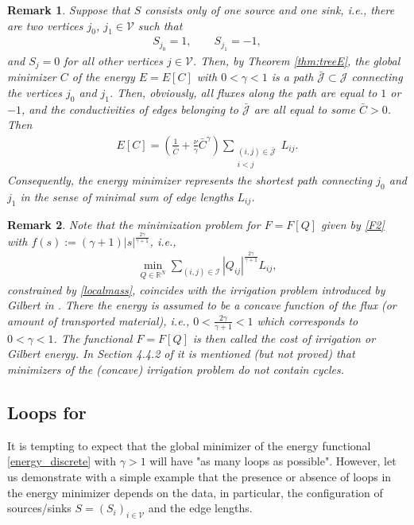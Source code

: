 \documentclass{article}
\numberwithin{equation}{section}
\newtheorem{remark}{Remark}%
\newcommand{\R}{\mathbb{R}}
\def\[{\begin{eqnarray*}}
\def\]{\end{eqnarray*}}
\begin{document}
\begin{remark}
Suppose that $S$ consists only of one source and one sink, i.e., there are
two vertices $j_0$, $j_1\in \mathcal{V}$ such that
\[
   S_{j_0} = 1, \qquad S_{j_1} = -1,
\]
and $S_j=0$ for all other vertices $j\in \mathcal{V}$.
Then, by Theorem \ref{thm:treeE}, the global minimizer $C$
of the energy $E=E[C]$ with $0<\gamma<1$ is a path $\bar{\mathcal{J}} \subset \mathcal{J} $
connecting the vertices $j_0$ and $j_1$.
Then, obviously, all fluxes along the path are equal to $1$ or $-1$,
and the conductivities of edges belonging to $\bar{\mathcal{J}}$ are all equal to some $\bar C>0$.
Then
\[
   E[C] = \left( \frac{1}{\bar C} + \frac{\nu}{\gamma} \bar C^\gamma \right)  \sum_{\substack{(i,j)\in\bar {\mathcal{J}}\\ i<j}} L_{ij}.
\]
Consequently, the energy minimizer represents the shortest path connecting $j_0$ and $j_1$
in the sense of minimal sum of edge lengths $L_{ij}$.
\end{remark}
\vspace{2mm}

\begin{remark}
Note that the minimization problem for $F=F[Q]$ given by \eqref{F2} with $f(s) := (\gamma+1) |s|^\frac{2\gamma}{\gamma+1}$, i.e.,
\[
   \min_{Q\in\R^N} \sum_{(i,j)\in\mathcal{I}} |Q_{ij}|^\frac{2\gamma}{\gamma+1} L_{ij},
\]
constrained by \eqref{localmass}, coincides with the \emph{irrigation problem} introduced by Gilbert in \cite{Gilbert}.
There the energy is assumed to be a concave function of the flux (or amount of transported material), i.e.,
$0 < \frac{2\gamma}{\gamma+1} < 1$ which corresponds to $0 < \gamma<1$.
The functional $F=F[Q]$ is then called the \emph{cost of irrigation} or \emph{Gilbert energy}.
In Section 4.4.2 of \cite{santambrogio2015optimal} it is mentioned (but not proved) that minimizers of the (concave) irrigation problem do not contain cycles.
\end{remark}


\subsection{Loops for }\label{subsec:notrees}
It is tempting to expect that the global minimizer of the energy functional \eqref{energy_discrete} with $\gamma>1$
will have "as many loops as possible". However, let us demonstrate with a simple example that the presence or absence of loops
in the energy minimizer depends on the data, in particular, the configuration of sources/sinks $S=(S_i)_{i\in\mathcal{V}}$ and the edge lengths.
\vspace{2mm}
\end{document}
